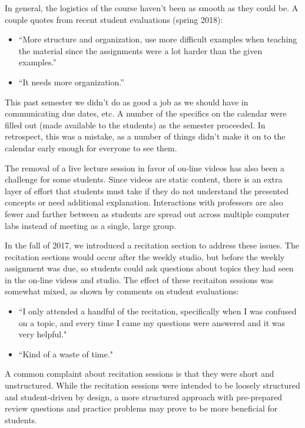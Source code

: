 
In general, the logistics of the course haven't been as smooth as they could be. A couple quotes from recent student evaluations (spring 2018):
\begin{itemize}
\item ``More structure and organization, use more difficult examples when teaching the material since the assignments were a lot harder than the given examples.''
\item ``It needs more organization.''
\end{itemize}

This past semester we didn't do as good a job as we should have in communicating due dates, etc. A number of the specifics on the calendar were filled out (made available to the students) as the semester proceeded. In retrospect, this was a mistake, as a number of things didn't make it on to the calendar early enough for everyone to see them.

The removal of a live lecture session in favor of on-line videos has also been a challenge for some students. Since videos are static content, there is an extra layer of effort that students must take if they do not understand the presented concepts or need additional explanation. Interactions with professors are also fewer and farther between as students are spread out across multiple computer labs instead of meeting as a single, large group.

In the fall of 2017, we introduced a recitation section to address these issues. The recitation sections would occur after the weekly studio, but before the weekly assignment was due, so students could ask questions about topics they had seen in the on-line videos and studio. The effect of these recitaiton sessions was somewhat mixed, as shown by comments on student evaluations:
\begin{itemize}
\item ``I only attended a handful of the recitation, specifically when I was
confused on a topic, and every time I came my questions were answered and
it was very helpful."
\item ``Kind of a waste of time."
\end{itemize}

A common complaint about recitation sessions is that they were short and unstructured. While the recitation sessions were intended to be loosely structured and student-driven by design, a more structured approach with pre-prepared review questions and practice problems may prove to be more beneficial for students.

